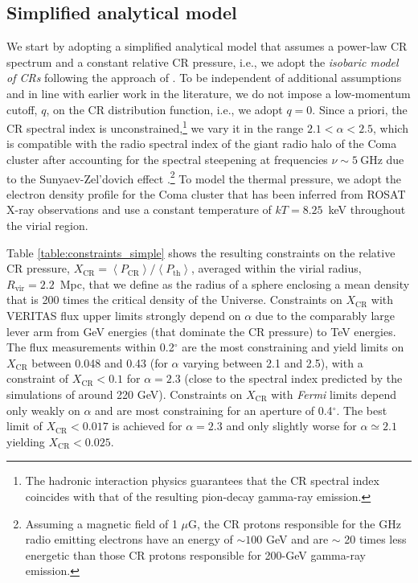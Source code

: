 \documentclass[12pt,manuscript]{aastex}
\def\Fermi{{\em Fermi}\xspace}
\newcommand{\expval}[1]{\left\langle #1 \right\rangle}
\newcommand{\rmn}{\mathrm}
\newcommand{\CR}{\mathrm{CR}}
\begin{document}
%
%

\subsection{Simplified analytical model}
\label{sec:simple}

We start by adopting a simplified analytical model that assumes a power-law CR spectrum and a
constant relative CR pressure, i.e., we adopt the {\em isobaric model of CRs} following the approach
of \citet{article:PfrommerEnsslin:2004b}. To be independent of additional assumptions and in line
with earlier work in the literature, we do not impose a low-momentum cutoff, $q$, on the CR
distribution function, i.e., we adopt $q=0$. Since a priori, the CR spectral index is
unconstrained,\footnote{The hadronic interaction physics guarantees that the CR spectral index
coincides with that of the resulting pion-decay gamma-ray emission.} we vary it in the range
$2.1<\alpha<2.5$, which is compatible with the radio spectral index of the giant radio halo of the
Coma cluster after accounting for the spectral steepening at frequencies $\nu\sim5~\rmn{GHz}$ due to
the Sunyaev-Zel'dovich effect \citep{article:Ensslin:2002,
article:PfrommerEnsslin:2004b}.\footnote{Assuming a magnetic field of 1 $\mu$G, the CR protons
responsible for the GHz radio emitting electrons have an energy of $\sim100$ GeV and are $\sim$ 20
times less energetic than those CR protons responsible for 200-GeV gamma-ray emission.} To model
the thermal pressure, we adopt the electron density profile for the Coma cluster that has been
inferred from ROSAT X-ray observations \citep{article:BrielHenryBohringer:1992} and use a constant
temperature of $kT= 8.25$~keV throughout the virial region.

Table \ref{table:constraints_simple} shows the resulting constraints on the relative CR pressure,
$X_{\CR} = \expval{P_{\CR}}/\expval{P_\rmn{th}}$, averaged within the virial radius,
$R_\rmn{vir}=2.2$~Mpc, that we define as the radius of a sphere enclosing a mean density that is 200
times the critical density of the Universe. Constraints on $X_\CR$ with VERITAS flux upper limits
strongly depend on $\alpha$ due to the comparably large lever arm from GeV energies (that dominate
the CR pressure) to TeV energies. The flux measurements within 0.2$^{\circ}$ are the most
constraining and yield limits on $X_\CR$ between 0.048 and 0.43 (for $\alpha$ varying between 2.1
and 2.5), with a constraint of $X_\CR<0.1$ for $\alpha=2.3$ (close to the spectral index predicted
by the simulations of \citet{article:PinzkePfrommer:2010} around 220 GeV).  Constraints on $X_\CR$
with \Fermi limits depend only weakly on $\alpha$ and are most constraining for an aperture of
0.4$^{\circ}$.  The best limit of $X_\CR< 0.017$ is achieved for $\alpha=2.3$ and only slightly
worse for $\alpha\simeq 2.1$ yielding $X_\CR<0.025$.
\end{document}
